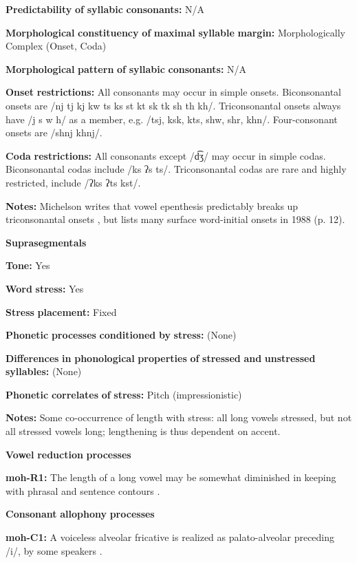 \textbf{Predictability} \textbf{of} \textbf{syllabic} \textbf{consonants:} N/A

\textbf{Morphological} \textbf{constituency} \textbf{of} \textbf{maximal} \textbf{syllable} \textbf{margin:} Morphologically Complex (Onset, Coda)

\textbf{Morphological} \textbf{pattern} \textbf{of} \textbf{syllabic} \textbf{consonants:} N/A

\textbf{Onset} \textbf{restrictions:} All consonants may occur in simple onsets. Biconsonantal onsets are /nj tj kj kw ts ks st kt sk tk sh th kh/. Triconsonantal onsets always have /j s w h/ as a member, e.g. /tsj, ksk, kts, shw, shr, khn/. Four-consonant onsets are /shnj khnj/.

\textbf{Coda} \textbf{restrictions:} All consonants except /d͡ʒ/ may occur in simple codas. Biconsonantal codas include /ks ʔs ts/. Triconsonantal codas are rare and highly restricted, include /ʔks ʔts kst/.

\textbf{Notes:} Michelson writes that vowel epenthesis predictably breaks up triconsonantal onsets , but lists many surface word-initial onsets in 1988 (p. 12).

\textbf{Suprasegmentals}

\textbf{Tone:} Yes

\textbf{Word} \textbf{stress:} Yes

\textbf{Stress} \textbf{placement:} Fixed

\textbf{Phonetic} \textbf{processes} \textbf{conditioned} \textbf{by} \textbf{stress:} (None)

\textbf{Differences} \textbf{in} \textbf{phonological} \textbf{properties} \textbf{of} \textbf{stressed} \textbf{and} \textbf{unstressed} \textbf{syllables:} (None)

\textbf{Phonetic} \textbf{correlates} \textbf{of} \textbf{stress:} Pitch (impressionistic)

\textbf{Notes:} Some co-occurrence of length with stress: all long vowels stressed, but not all stressed vowels long; lengthening is thus dependent on accent.

\textbf{Vowel} \textbf{reduction} \textbf{processes}

\textbf{moh-R1:} The length of a long vowel may be somewhat diminished in keeping with phrasal and sentence contours \citep[46]{Bonvillain1973}.

\textbf{Consonant} \textbf{allophony} \textbf{processes}

\textbf{moh-C1:} A voiceless alveolar fricative is realized as palato-alveolar preceding /i/, by some speakers \citep[31]{Bonvillain1973}.


